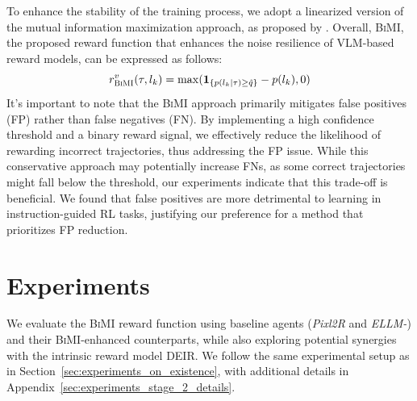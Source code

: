 \documentclass{article}
\theoremstyle{plain}
\theoremstyle{definition}
\theoremstyle{remark}
\begin{document}
To enhance the stability of the training process, we adopt a linearized version of the mutual information maximization approach, as proposed by \citet{li2023internally}. Overall, \textsc{BiMI}, the proposed reward function that enhances the noise resilience of VLM-based reward models, can be expressed as follows:
\begin{equation}
    r^v_{\textsc{BiMI}}(\tau, l_k) = \max(\mathbf{1}_{\{p(l_k\mid \tau) \geq \hat q\}} - p(l_k),0)
\end{equation}
\noindent It's important to note that the \textsc{BiMI} approach primarily mitigates false positives (FP) rather than false negatives (FN). By implementing a high confidence threshold and a binary reward signal, we effectively reduce the likelihood of rewarding incorrect trajectories, thus addressing the FP issue. While this conservative approach may potentially increase FNs, as some correct trajectories might fall below the threshold, our experiments indicate that this trade-off is beneficial. We found that false positives are more detrimental to learning in instruction-guided RL tasks, justifying our preference for a method that prioritizes FP reduction. 


\section{Experiments}
\label{sec:experiments}


We evaluate the \textsc{BiMI} reward function using baseline agents (\emph{Pixl2R} and \emph{ELLM-}) and their \textsc{BiMI}-enhanced counterparts, while also exploring potential synergies with the intrinsic reward model DEIR. We follow the same experimental setup as in Section~\ref{sec:experiments_on_existence}, with additional details in Appendix~\ref{sec:experiments_stage_2_details}. 
\end{document}
